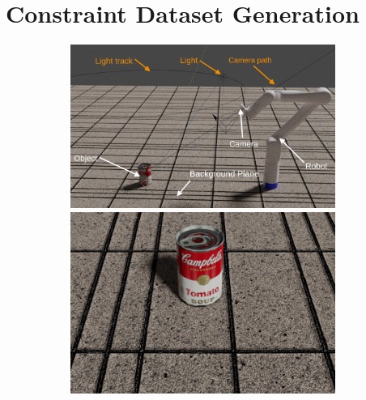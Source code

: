 

\hypertarget{constraint-based-subset-dataset-generation-using-blender}{%
\section{Constraint Dataset Generation}\label{constraint-based-subset-dataset-generation-using-blender}}

\begin{figure}[t]
  \centering
\begin{subfigure}[b]{0.65\linewidth}
    \centering
\includegraphics[width=0.95\textwidth]{images/robot_objects_blender_scene_annotated.png}
 \caption{}\label{fig:scene}
\includegraphics[width=0.95\textwidth]{images/rendered_object.png}
    \caption{}\label{fig:render}
\end{subfigure}%
\begin{subfigure}[b]{0.35\linewidth}
    \centering

\end{subfigure}
\end{figure}
